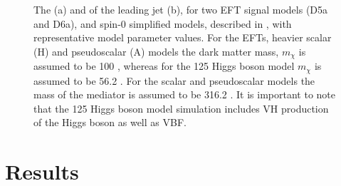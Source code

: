 \begin{figure}
  \caption{The \MET (a) and \eta of the leading jet (b), for two \ac{EFT} signal models (D5a and D6a), and spin-0 simplified models, described in , with representative model parameter values. For the \ac{EFT}s, heavier scalar (H) and pseudoscalar (A) models the dark matter mass, $m_{\chi}$ is assumed to be 100 \GeV, whereas for the 125 \GeV Higgs boson model $m_{\chi}$ is assumed to be 56.2 \GeV. For the scalar and pseudoscalar models the mass of the mediator is assumed to be 316.2 \GeV. It is important to note that the 125 \GeV Higgs boson model simulation includes \ac{VH} production of the Higgs boson as well as \ac{VBF}.}
  \label{fig:dmmodelkinematics}
\end{figure}

\section{Results}
\label{sec:dmresults}

\begin{figure}

  \caption{}%
  \label{fig:smprojectedlimits}
\end{figure}

